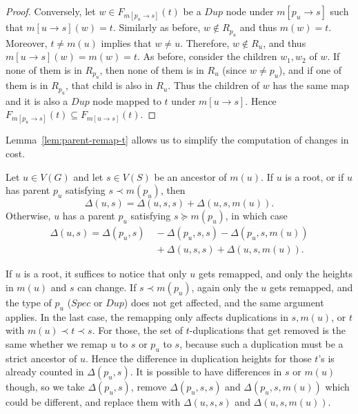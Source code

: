 \documentclass[10pt]{article}
\begin{document}
\begin{toappendix}
\begin{proof}
    Conversely, let $w \in F_{m[p_u \rightarrow s]}(t)$ be a $Dup$ node under $m[p_u \rightarrow s]$ such that $m[u \rightarrow s](w) = t$.  Similarly as before, $w \notin R_{p_u}$ and thus $m(w) = t$.  Moreover, $t \neq m(u)$  implies that $w \neq u$.  Therefore, $w \notin R_u$, and thus $m[u \rightarrow s](w) = m(w) = t$. 
    As before, consider the children $w_1, w_2$ of $w$.  If none of them is in $R_{p_u}$, then none of them is in $R_u$ (since $w \neq p_u$), and if one of them is in $R_{p_u}$, that child is also in $R_u$.  Thus the children of $w$ has the same map and it is also a $Dup$ node mapped to $t$ under $m[u \rightarrow s]$.  Hence $F_{m[p_u \rightarrow s]}(t) \subseteq F_{m[u \rightarrow s]}(t)$.
\end{proof}

Lemma~\ref{lem:parent-remap-t} allows us to simplify the computation of changes in cost.
\end{toappendix}

\begin{lemmarep}\label{lem:deltasum}
    Let $u \in V(G)$ and let $s \in V(S)$ be an ancestor of $m(u)$.
    If $u$ is a root, or if $u$ has parent $p_u$ satisfying $s \prec m(p_u)$, then
    \[
    \Delta(u, s) = \Delta(u, s, s) + \Delta(u, s, m(u)).
    \]
    Otherwise, $u$ has a parent $p_u$ satisfying $s \succeq m(p_u)$, in which case
    \begin{align*}
    \Delta(u, s) = \Delta(p_u, s) &~- \Delta(p_u, s, s) - \Delta(p_u, s, m(u)) \\
    &~+ \Delta(u, s, s) + \Delta(u, s, m(u)).
    \end{align*}
\end{lemmarep}

\begin{proofsketch}
	If $u$ is a root, it suffices to notice that only $u$ gets remapped, and only the heights in $m(u)$ and $s$ can change.    If $s \prec m(p_u)$, again only the $u$ gets remapped, and the type of $p_u$ ($Spec$ or $Dup$) does not get affected, and the same argument applies.  In the last case, the remapping only affects duplications in $s, m(u)$, or $t$ with $m(u) \prec t \prec s$.  For those, the set of $t$-duplications that get removed is the same whether we remap $u$ to $s$ or $p_u$ to $s$, because such a duplication must be a strict ancestor of $u$.  Hence the difference in duplication heights for those $t$'s is already counted in $\Delta(p_u, s)$.  It is possible to have differences in $s$ or $m(u)$ though, so we take $\Delta(p_u, s)$, remove $\Delta(p_u, s, s)$ and $\Delta(p_u, s, m(u))$ which could be different, and replace them with $\Delta(u, s, s)$ and $\Delta(u, s, m(u))$.
\end{proofsketch}
\end{document}
